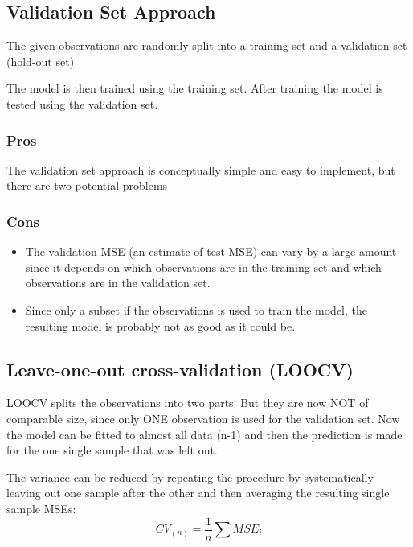 \documentclass[../Main.tex]{subfiles}
\begin{document}
\begin{multicols}{2}

    \subsection{Validation Set Approach} 
    The given observations are randomly 
    split into a training set and a 
    validation set (hold-out set)

    The model is then trained using the 
    training set.
    After training the model is tested 
    using the validation set.

    \subsubsection{Pros}
    The validation set approach is 
    conceptually simple and easy to 
    implement, but there are two 
    potential problems

    \subsubsection{Cons}
    \begin{itemize}
        \item The validation MSE (an estimate of test 
        MSE) can vary by a large amount since it 
        depends on which observations are in the 
        training set and which observations are in 
        the validation set.
    
        \item Since only a subset if the observations is 
        used to train the model, the resulting 
        model is probably not as good as it could 
        be.
    \end{itemize}

    \subsection{Leave-one-out cross-validation (LOOCV)}
    LOOCV splits the observations into two parts.
    But they are now NOT of comparable size, 
    since only ONE observation is used for the validation set.
    Now the model can be fitted to almost all 
    data (n-1) and then the prediction is made 
    for the one single sample that was left out.


    The variance can be reduced by repeating 
    the procedure by systematically leaving out 
    one sample after the other and then 
    averaging the resulting single sample MSEs:
    \begin{equation*}
        CV_{(n)} = \frac{1}{n} \sum MSE_i
    \end{equation*}


\end{multicols}
\end{document}
